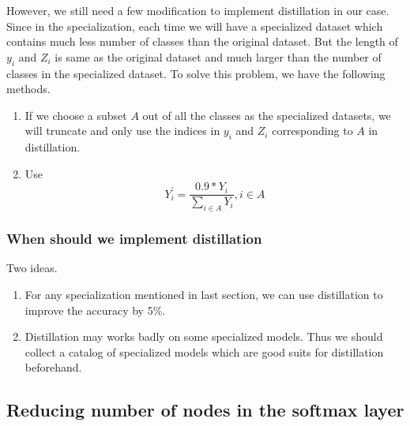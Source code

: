 \documentclass{article}
\begin{document}
However, we still need a few modification to implement distillation in our case. Since in the specialization, each time we will have a specialized dataset which contains much less number of classes than the original dataset. But the length of $y_i$ and $Z_i$ is same as the original dataset and much larger than the number of classes in the specialized dataset. To solve this problem, we have the following methods.
\begin{enumerate}
    \item If we choose a subset $A$ out of all the classes as the specialized datasets, we will truncate and only use the indices in $y_i$ and $Z_i$ corresponding to $A$ in distillation.
    \item Use 
        \begin{equation}
            Y_{i}^{'} = \frac{0.9*Y_i}{\sum_{i \in A} Y_i}, i \in A
        \end{equation}    
\end{enumerate}



\subsubsection{When should we implement distillation}
Two ideas.
\begin{enumerate}
    \item For any specialization mentioned in last section, we can use distillation to improve the accuracy by 5\%.
    \item Distillation may works badly on some specialized models. Thus we should collect a catalog of specialized models which are good suits for distillation beforehand.
\end{enumerate}


\subsection{Reducing number of nodes in the softmax layer}
\end{document}
